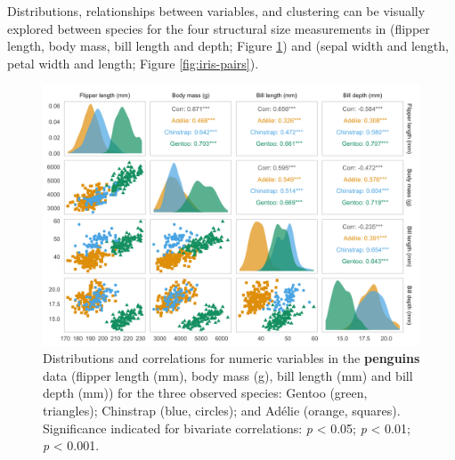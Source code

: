 Distributions, relationships between variables, and clustering can be
visually explored between species for the four structural size
measurements in  (flipper length, body mass, bill length
and depth; Figure \ref{fig:penguin-pairs}) and  (sepal width
and length, petal width and length; Figure \ref{fig:iris-pairs}).

\begin{Schunk}
\begin{figure}

{\centering \includegraphics[width=\textwidth]{figs/penguin-pairs-1} 

}

\caption{Distributions and correlations for numeric variables in the \textbf{penguins} data (flipper length (mm), body mass (g), bill length (mm) and bill depth (mm)) for the three observed species: Gentoo (green, triangles); Chinstrap (blue, circles); and Adélie (orange, squares). Significance indicated for bivariate correlations: \text{*}\textit{p} < 0.05; \text{*}\text{*}\textit{p} < 0.01; \text{*}\text{*}\text{*}\textit{p} < 0.001.}\label{fig:penguin-pairs}
\end{figure}
\end{Schunk}

